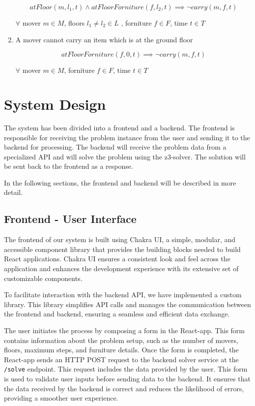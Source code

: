 \documentclass[a4paper, 11pt]{article}
\begin{document}
\begin{enumerate}
    $$atFloor(m, l_1,t) \land atFloorForniture(f, l_2, t) \implies \lnot carry(m, f, t)$$

    $\forall$ mover $m \in M$, floors $l_1 \neq l_2 \in L$ , forniture $f \in F$, time $t \in T$

    \item A mover cannot carry an item which is at the ground floor

    $$atFloorForniture(f, 0, t) \implies \lnot carry(m, f, t)$$

    $\forall$ mover $m \in M$, forniture $f \in F$, time $t \in T$
    
    
\end{enumerate}

\pagebreak

\section{System Design}
The system has been divided into a frontend and a backend. The frontend is responsible for receiving the problem instance from the user and sending it to the backend for processing. The backend will receive the problem data from a specialized API and will solve the problem using the z3-solver. The solution will be sent back to the frontend as a response.

In the following sections, the frontend and backend will be described in more detail.

\subsection{Frontend - User Interface}
The frontend of our system is built using Chakra UI, a simple, modular, and accessible component library that provides the building blocks needed to build React applications. Chakra UI ensures a consistent look and feel across the application and enhances the development experience with its extensive set of customizable components.

To facilitate interaction with the backend API, we have implemented a custom library. This library simplifies API calls and manages the communication between the frontend and backend, ensuring a seamless and efficient data exchange.

The user initiates the process by composing a form in the React-app. This form contains information about the problem setup, such as the number of movers, floors, maximum steps, and furniture details. Once the form is completed, the React-app sends an HTTP POST request to the backend solver service at the \texttt{/solve} endpoint. This request includes the data provided by the user. This form is used to validate user inputs before sending data to the backend. It ensures that the data received by the backend is correct and reduces the likelihood of errors, providing a smoother user experience.
\end{document}
